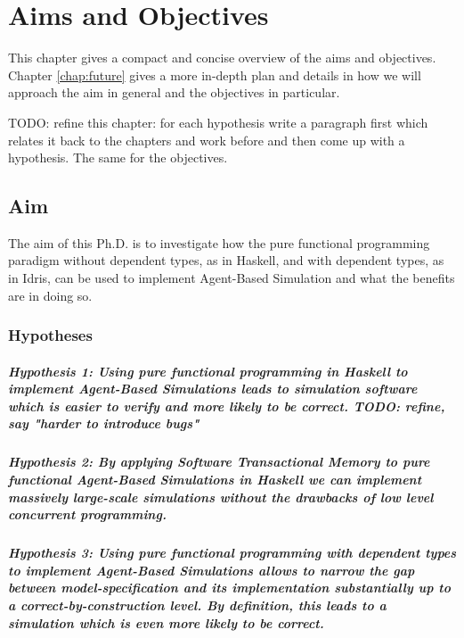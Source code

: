 \chapter{Aims and Objectives}
\label{chap:aimsObj}

This chapter gives a compact and concise overview of the aims and objectives. Chapter \ref{chap:future} gives a more in-depth plan and details in how we will approach the aim in general and the objectives in particular.

TODO: refine this chapter: for each hypothesis write a paragraph first which relates it back to the chapters and work before and then come up with a hypothesis. The same for the objectives.

\section{Aim}
The aim of this Ph.D. is to investigate how the pure functional programming paradigm without dependent types, as in Haskell, and with dependent types, as in Idris, can be used to implement Agent-Based Simulation and what the benefits are in doing so.

\subsection{Hypotheses}
\paragraph{Hypothesis 1: Using pure functional programming in Haskell to implement Agent-Based Simulations leads to simulation software which is easier to verify and more likely to be correct. TODO: refine, say "harder to introduce bugs"}

\paragraph{Hypothesis 2: By applying Software Transactional Memory to pure functional Agent-Based Simulations in Haskell we can implement massively large-scale simulations without the drawbacks of low level concurrent programming.}

\paragraph{Hypothesis 3: Using pure functional programming with dependent types to implement Agent-Based Simulations allows to narrow the gap between model-specification and its implementation substantially up to a correct-by-construction level. By definition, this leads to a simulation which is even more likely to be correct.}

